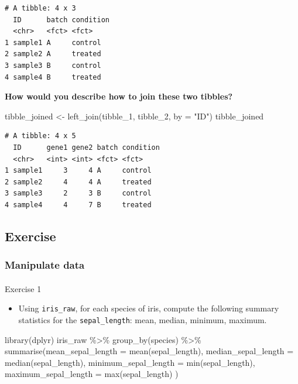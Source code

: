 \documentclass[
  letterpaper,
  DIV=11,
  numbers=noendperiod]{scrartcl}
\makeatletter
\let\oldparagraph\paragraph
\renewcommand{\paragraph}{
    \@ifstar
      \xxxParagraphStar
      \xxxParagraphNoStar
  }
\newcommand{\xxxParagraphStar}[1]{\oldparagraph*{#1}\mbox{}}
\newcommand{\xxxParagraphNoStar}[1]{\oldparagraph{#1}\mbox{}}
\newenvironment{Shaded}{\begin{snugshade}}{\end{snugshade}}
\newcommand{\AttributeTok}[1]{\textcolor[rgb]{0.40,0.45,0.13}{#1}}
\newcommand{\FunctionTok}[1]{\textcolor[rgb]{0.28,0.35,0.67}{#1}}
\newcommand{\NormalTok}[1]{\textcolor[rgb]{0.00,0.23,0.31}{#1}}
\newcommand{\OtherTok}[1]{\textcolor[rgb]{0.00,0.23,0.31}{#1}}
\newcommand{\SpecialCharTok}[1]{\textcolor[rgb]{0.37,0.37,0.37}{#1}}
\newcommand{\StringTok}[1]{\textcolor[rgb]{0.13,0.47,0.30}{#1}}
\providecommand{\tightlist}{%
  \setlength{\itemsep}{0pt}\setlength{\parskip}{0pt}}\usepackage{longtable,booktabs,array}
\makeatother
\begin{document}
\begin{verbatim}
# A tibble: 4 x 3
  ID      batch condition
  <chr>   <fct> <fct>    
1 sample1 A     control  
2 sample2 A     treated  
3 sample3 B     control  
4 sample4 B     treated  
\end{verbatim}

\textbf{How would you describe how to join these two tibbles?}

\begin{Shaded}
\begin{Highlighting}[]
\NormalTok{tibble\_joined }\OtherTok{\textless{}{-}} \FunctionTok{left\_join}\NormalTok{(tibble\_1, tibble\_2, }\AttributeTok{by =} \StringTok{"ID"}\NormalTok{)}
\NormalTok{tibble\_joined}
\end{Highlighting}
\end{Shaded}

\begin{verbatim}
# A tibble: 4 x 5
  ID      gene1 gene2 batch condition
  <chr>   <int> <int> <fct> <fct>    
1 sample1     3     4 A     control  
2 sample2     4     4 A     treated  
3 sample3     2     3 B     control  
4 sample4     4     7 B     treated  
\end{verbatim}

\subsection{Exercise}\label{exercise-1}

\subsubsection{Manipulate data}\label{manipulate-data}

\paragraph{Exercise 1}\label{exercise-1-1}

\begin{itemize}
\tightlist
\item
  Using \texttt{iris\_raw}, for each species of iris, compute the
  following summary statistics for the \texttt{sepal\_length}: mean,
  median, minimum, maximum.
\end{itemize}

\begin{Shaded}
\begin{Highlighting}[]
\FunctionTok{library}\NormalTok{(dplyr)}
\NormalTok{iris\_raw }\SpecialCharTok{\%\textgreater{}\%} 
  \FunctionTok{group\_by}\NormalTok{(species) }\SpecialCharTok{\%\textgreater{}\%} 
  \FunctionTok{summarise}\NormalTok{(}\AttributeTok{mean\_sepal\_length =} \FunctionTok{mean}\NormalTok{(sepal\_length), }
            \AttributeTok{median\_sepal\_length =} \FunctionTok{median}\NormalTok{(sepal\_length),}
            \AttributeTok{minimum\_sepal\_length =} \FunctionTok{min}\NormalTok{(sepal\_length),}
            \AttributeTok{maximum\_sepal\_length =} \FunctionTok{max}\NormalTok{(sepal\_length)}
\NormalTok{            )}
\end{Highlighting}
\end{Shaded}
\end{document}
